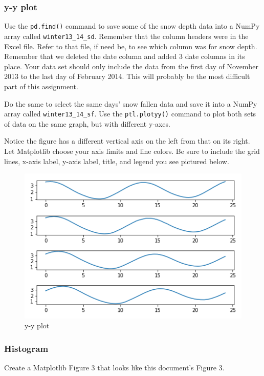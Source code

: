 \documentclass[11pt]{article}
\makeatletter
\def\maxwidth{\ifdim\Gin@nat@width>\linewidth\linewidth
    \else\Gin@nat@width\fi}
\let\Oldincludegraphics\includegraphics
\renewcommand{\includegraphics}[1]{\Oldincludegraphics[width=.8\maxwidth]{#1}}
\makeatother
\begin{document}
    \hypertarget{y-y-plot}{%
\subsubsection{y-y plot}\label{y-y-plot}}

Use the \texttt{pd.find()} command to save some of the snow depth data
into a NumPy array called \texttt{winter13\_14\_sd}. Remember that the
column headers were in the Excel file. Refer to that file, if need be,
to see which column was for snow depth. Remember that we deleted the
date column and added 3 date columns in its place. Your data set should
only include the data from the first day of November 2013 to the last
day of February 2014. This will probably be the most difficult part of
this assignment.

Do the same to select the same days' snow fallen data and save it into a
NumPy array called \texttt{winter13\_14\_sf}. Use the
\texttt{ptl.plotyy()} command to plot both sets of data on the same
graph, but with different y-axes.

Notice the figure has a different vertical axis on the left from that on
its right. Let Matplotlib choose your axis limits and line colors. Be
sure to include the grid lines, x-axis label, y-axis label, title, and
legend you see pictured below.

\begin{figure}
\centering
\includegraphics{images/fig2.png}
\caption{y-y plot}
\end{figure}

    \hypertarget{histogram}{%
\subsubsection{Histogram}\label{histogram}}

Create a Matplotlib Figure 3 that looks like this document's Figure 3.
\end{document}

